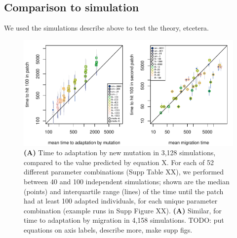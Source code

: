 \documentclass{article}
\begin{document}
\subsection{Comparison to simulation}
\label{ss:comparison_to_sims}

We used the simulations describe above to test the theory,
etcetera.


\begin{figure}[ht!]
  \begin{center}
      \includegraphics{times-predicted-observed}
  \end{center}
  \caption{
      \textbf{(A)} Time to adaptation by new mutation 
      in 3,128 simulations,
      compared to the value predicted by equation X.
      For each of 52 different parameter combinations (Supp Table XX),
      we performed between 40 and 100 independent simulations;
      shown are the median (points) and interquartile range (lines)
      of the time until the patch had at least 100 adapted individuals,
      for each unique parameter combination (example runs in Supp Figure XX).
      \textbf{(A)} Similar, for time to adaptation by migration
      in 4,158 simulations.
      TODO: put equations on axis labels, describe more, make supp figs.
  }   \label{fig:sim_times}
\end{figure}
\end{document}
